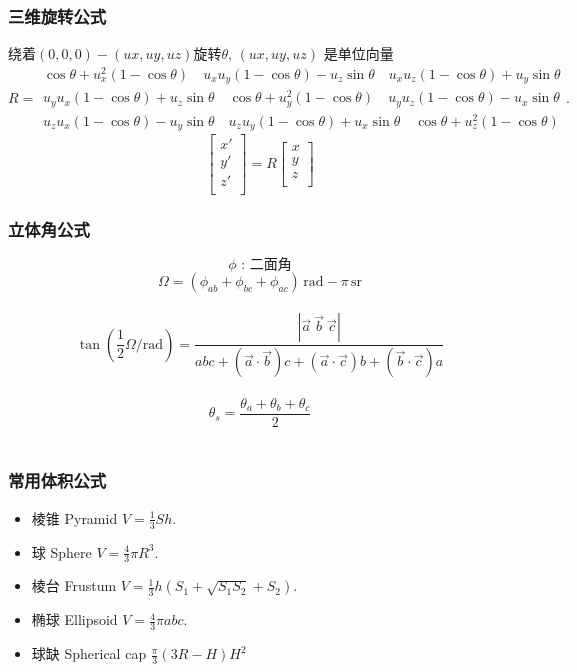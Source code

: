 \begin{small}
\begin{spacing}{0.5}
\subsubsection{三维旋转公式}
绕着$(0,0,0)-(ux,uy,uz)$旋转$\theta$, $(ux,uy,uz)$ 是单位向量
\[
R = \begin{smallmatrix} \cos \theta +u_x^2 \left(1-\cos \theta\right) \quad u_x u_y \left(1-\cos \theta\right) - u_z \sin \theta \quad u_x u_z \left(1-\cos \theta\right) + u_y \sin \theta \\ u_y u_x \left(1-\cos \theta\right) + u_z \sin \theta \quad \cos \theta + u_y^2\left(1-\cos \theta\right) \quad u_y u_z \left(1-\cos \theta\right) - u_x \sin \theta \\ u_z u_x \left(1-\cos \theta\right) - u_y \sin \theta \quad u_z u_y \left(1-\cos \theta\right) + u_x \sin \theta \quad \cos \theta + u_z^2\left(1-\cos \theta\right) 
\end{smallmatrix}.
\]
\[
\begin{bmatrix}
x' \\
y' \\
z' \\
\end{bmatrix} = R
\begin{bmatrix}
x \\
y \\
z \\
\end{bmatrix}
\]
\subsubsection{立体角公式}
\[ \phi \text{ : 二面角}\] 
\[ \Omega = \left(\phi_{ab} + \phi_{bc} + \phi_{ac}\right)\,\mathrm{rad} - \pi\,\mathrm{sr} \]\\
\[\tan \left( \frac{1}{2} \Omega/\mathrm{rad} \right) =
    \frac{\left|\vec a\ \vec b\ \vec c\right|}{abc + \left(\vec a \cdot \vec b\right)c + \left(\vec a \cdot \vec c\right)b + \left(\vec b \cdot \vec c\right)a}\]\\
\[\theta_s = \frac {\theta_a + \theta_b + \theta_c}{2}\]\\
\subsubsection{常用体积公式}
\begin{itemize}
\item 棱锥 Pyramid $V=\frac{1}{3}Sh$.
\item 球 Sphere $V=\frac{4}{3}\pi R^3$.
\item 棱台 Frustum $V=\frac{1}{3}h(S_1+\sqrt {S_1S_2}+S_2)$.
\item 椭球 Ellipsoid $V=\frac{4}{3} \pi abc$.
\item 球缺 Spherical cap $\frac{\pi}{3}(3R-H)H^2$
\end{itemize}

\end{spacing}
\end{small}
